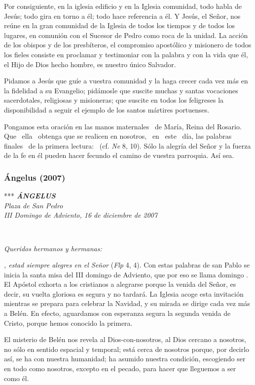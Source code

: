 Por consiguiente, en la iglesia edificio y en la Iglesia comunidad, todo habla de Jesús; todo gira en torno a él; todo hace referencia a él. Y Jesús, el Señor, nos reúne en la gran comunidad de la Iglesia de todos los tiempos y de todos los lugares, en comunión con el Sucesor de Pedro como roca de la unidad. La acción de los obispos y de los presbíteros, el compromiso apostólico y misionero de todos los fieles consiste en proclamar y testimoniar con la palabra y con la vida que él, el Hijo de Dios hecho hombre, es nuestro único Salvador.

Pidamos a Jesús que guíe a vuestra comunidad y la haga crecer cada vez más en la fidelidad a su Evangelio; pidámosle que suscite muchas y santas vocaciones sacerdotales, religiosas y misioneras; que suscite en todos los feligreses la disponibilidad a seguir el ejemplo de los santos mártires portuenses.

Pongamos esta oración en las manos maternales ~de María, Reina del Rosario. Que ~ella ~obtenga que se realicen en nosotros, ~en ~este ~día, las palabras finales ~de la primera lectura:~  (cf. \emph{Ne} 8, 10). Sólo la alegría del Señor y la fuerza de la fe en él pueden hacer fecundo el camino de vuestra parroquia. Así sea.

\subsubsection{Ángelus (2007)} *** \emph{\textbf{ÁNGELUS}\\[2\baselineskip]Plaza de San Pedro\\ III Domingo de Adviento, 16 de diciembre de 2007}

~

\emph{Queridos hermanos y hermanas:}~

\emph{, estad siempre alegres en el Señor} (\emph{Flp} 4, 4). Con estas palabras de san Pablo se inicia la santa misa del III domingo de Adviento, que por eso se llama domingo \emph{}. El Apóstol exhorta a los cristianos a alegrarse porque la venida del Señor, es decir, su vuelta gloriosa es segura y no tardará. La Iglesia acoge esta invitación mientras se prepara para celebrar la Navidad, y su mirada se dirige cada vez más a Belén. En efecto, aguardamos con esperanza segura la segunda venida de Cristo, porque hemos conocido la primera.

El misterio de Belén nos revela al Dios-con-nosotros, al Dios cercano a nosotros, no sólo en sentido espacial y temporal; está cerca de nosotros porque, por decirlo así, se ha  con nuestra humanidad; ha asumido nuestra condición, escogiendo ser en todo como nosotros, excepto en el pecado, para hacer que lleguemos a ser como él.

